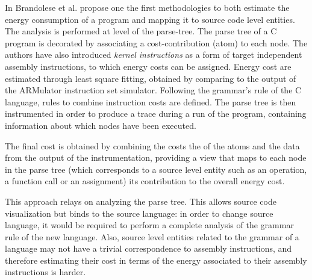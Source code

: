 In \cite{brando2008} Brandolese et al. propose one the first methodologies to both estimate the energy consumption of a program and mapping it to source code level entities. The analysis is performed at level of the parse-tree. The parse tree of a C program is decorated by associating a cost-contribution (atom) to each node. The authors have also introduced \emph{kernel instructions} as a form of target independent assembly instructions, to which energy costs can be assigned. Energy cost are estimated through least square fitting, obtained by comparing to the output of the ARMulator instruction set simulator. Following the grammar's rule of the C language, rules to combine instruction costs are defined. The parse tree is then instrumented in order to produce a trace during a run of the program, containing information about which nodes have been executed. \par 
The final cost is obtained by combining the costs the of the atoms and the data from the output of the instrumentation, providing a view that maps to each node in the parse tree (which corresponds to a source level entity such as an operation, a function call or an assignment) its contribution to the overall energy cost. \par 
This approach relays on analyzing the parse tree. This allows source code visualization but binds to the source language: in order to change source language, it would be required to perform a complete analysis of the grammar rule of the new language. Also, source level entities related to the grammar of a language may not have a trivial correspondence to assembly instructions, and therefore estimating their cost in terms of the energy associated to their assembly instructions is harder. \\[1in]


